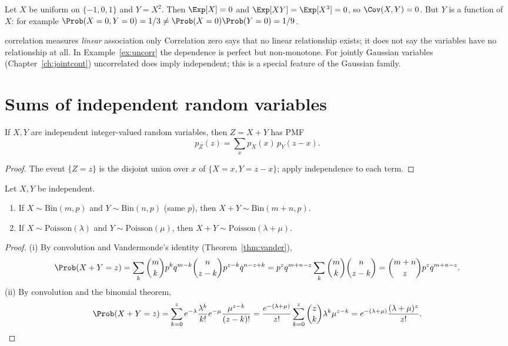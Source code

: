 \begin{example}\label{ex:uncorr}
Let $X$ be uniform on $\{-1,0,1\}$ and $Y=X^2$. Then $\Exp[X]=0$ and
$\Exp[XY]=\Exp[X^3]=0$, so $\Cov(X,Y)=0$. But $Y$ is a function of $X$: for
example $\Prob(X=0,Y=0)=1/3\ne\Prob(X=0)\Prob(Y=0)=1/9$.
\end{example}

\begin{nuance}{correlation measures \emph{linear} association only}
Correlation zero says that no linear relationship exists; it does not say the
variables have no relationship at all. In Example~\ref{ex:uncorr} the dependence
is perfect but non-monotone. For jointly Gaussian variables (Chapter~\ref{ch:jointcont})
uncorrelated does imply independent; this is a special feature of the Gaussian
family.
\end{nuance}

\section{Sums of independent random variables}

\begin{theorem}[Convolution]\label{thm:convolution}
If $X,Y$ are independent integer-valued random variables, then $Z=X+Y$ has PMF
\[
p_Z(z)=\sum_xp_X(x)\,p_Y(z-x).
\]
\end{theorem}
\begin{proof}
The event $\{Z=z\}$ is the disjoint union over $x$ of
$\{X=x,Y=z-x\}$; apply independence to each term.
\end{proof}

\begin{theorem}\label{thm:closure}
Let $X,Y$ be independent.
\begin{enumerate}[label=(\roman*)]
\item If $X\sim\mathrm{Bin}(m,p)$ and $Y\sim\mathrm{Bin}(n,p)$ (same $p$), then
$X+Y\sim\mathrm{Bin}(m+n,p)$.
\item If $X\sim\mathrm{Poisson}(\lambda)$ and $Y\sim\mathrm{Poisson}(\mu)$, then
$X+Y\sim\mathrm{Poisson}(\lambda+\mu)$.
\end{enumerate}
\end{theorem}
\begin{proof}
(i) By convolution and Vandermonde's identity (Theorem~\ref{thm:vander}),
\[
\Prob(X+Y=z)=\sum_k\binom mkp^kq^{m-k}\binom n{z-k}p^{z-k}q^{n-z+k}
=p^zq^{m+n-z}\sum_k\binom mk\binom n{z-k}=\binom{m+n}zp^zq^{m+n-z}.
\]
(ii) By convolution and the binomial theorem,
\[
\Prob(X+Y=z)=\sum_{k=0}^ze^{-\lambda}\frac{\lambda^k}{k!}e^{-\mu}\frac{\mu^{z-k}}{(z-k)!}
=\frac{e^{-(\lambda+\mu)}}{z!}\sum_{k=0}^z\binom zk\lambda^k\mu^{z-k}
=e^{-(\lambda+\mu)}\frac{(\lambda+\mu)^z}{z!}.\qedhere
\]
\end{proof}

